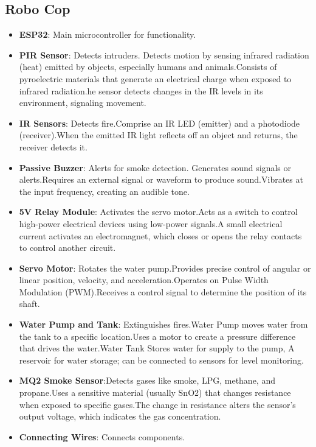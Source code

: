 \documentclass[conference]{IEEEtran}
\begin{document}
\subsection{\textbf{Robo Cop}}
\begin{itemize}
    \item \textbf{ESP32}: Main microcontroller for functionality.
    \item \textbf{PIR Sensor}: Detects intruders. Detects motion by sensing infrared radiation (heat) emitted by objects, especially humans and animals.Consists of pyroelectric materials that generate an electrical charge when exposed to infrared radiation.he sensor detects changes in the IR levels in its environment, signaling movement.
    \item \textbf{IR Sensors}: Detects fire.Comprise an IR LED (emitter) and a photodiode (receiver).When the emitted IR light reflects off an object and returns, the receiver detects it.
    \item \textbf{Passive Buzzer}: Alerts for smoke detection. Generates sound signals or alerts.Requires an external signal or waveform to produce sound.Vibrates at the input frequency, creating an audible tone.
    \item \textbf{5V Relay Module}: Activates the servo motor.Acts as a switch to control high-power electrical devices using low-power signals.A small electrical current activates an electromagnet, which closes or opens the relay contacts to control another circuit.
    \item \textbf{Servo Motor}: Rotates the water pump.Provides precise control of angular or linear position, velocity, and acceleration.Operates on Pulse Width Modulation (PWM).Receives a control signal to determine the position of its shaft.
    \item \textbf{Water Pump and Tank}: Extinguishes fires.Water Pump moves water from the tank to a specific location.Uses a motor to create a pressure difference that drives the water.Water Tank Stores water for supply to the pump, A reservoir for water storage; can be connected to sensors for level monitoring.
    \item  \textbf{MQ2 Smoke Sensor}:Detects gases like smoke, LPG, methane, and propane.Uses a sensitive material (usually SnO2) that changes resistance when exposed to specific gases.The change in resistance alters the sensor's output voltage, which indicates the gas concentration.
    \item  \textbf{Connecting Wires}: Connects components.
\end{itemize}
\end{document}
